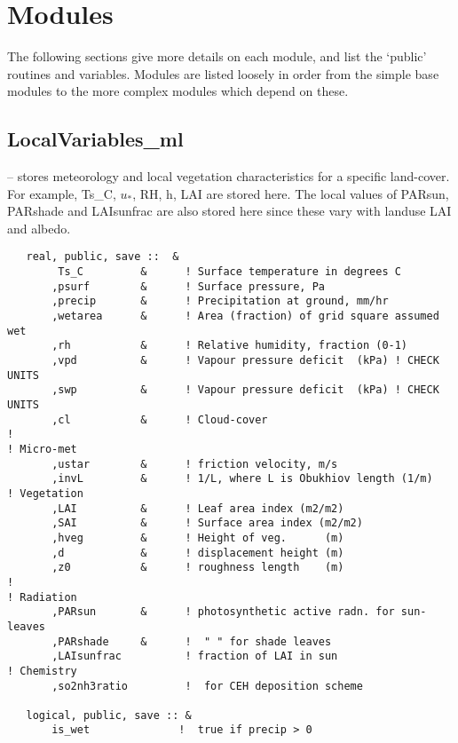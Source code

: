 \documentclass[12pt]{article}
\begin{document}
\section{Modules}


The following sections give more details on each module, and list the
`public' routines and variables.  Modules are listed loosely in order from
the simple base modules to the more complex modules which depend on
these.



\subsection{LocalVariables\_ml}

--  stores meteorology and local vegetation characteristics for a specific land-cover.
  For example, Ts\_C, $u_*$, RH, h, LAI  are stored here.
  The local values of PARsun, PARshade and LAIsunfrac are also stored here
  since these vary with landuse LAI and albedo.

\begin{footnotesize}
\begin{verbatim}
   real, public, save ::  &
        Ts_C         &      ! Surface temperature in degrees C
       ,psurf        &      ! Surface pressure, Pa
       ,precip       &      ! Precipitation at ground, mm/hr
       ,wetarea      &      ! Area (fraction) of grid square assumed wet
       ,rh           &      ! Relative humidity, fraction (0-1)
       ,vpd          &      ! Vapour pressure deficit  (kPa) ! CHECK UNITS
       ,swp          &      ! Vapour pressure deficit  (kPa) ! CHECK UNITS
       ,cl           &      ! Cloud-cover
!
! Micro-met
       ,ustar        &      ! friction velocity, m/s
       ,invL         &      ! 1/L, where L is Obukhiov length (1/m)
! Vegetation
       ,LAI          &      ! Leaf area index (m2/m2)
       ,SAI          &      ! Surface area index (m2/m2)
       ,hveg         &      ! Height of veg.      (m)
       ,d            &      ! displacement height (m)
       ,z0           &      ! roughness length    (m)
!
! Radiation
       ,PARsun       &      ! photosynthetic active radn. for sun-leaves
       ,PARshade     &      !  " " for shade leaves
       ,LAIsunfrac          ! fraction of LAI in sun
! Chemistry
       ,so2nh3ratio         !  for CEH deposition scheme

   logical, public, save :: &
       is_wet              !  true if precip > 0
\end{verbatim}
\end{footnotesize}
\end{document}
